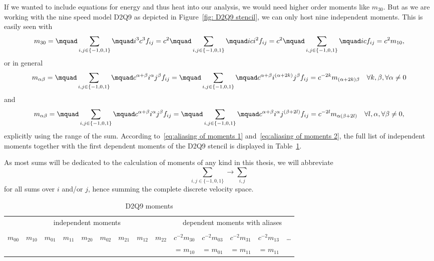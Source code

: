 If we wanted to include equations for energy and thus heat into our analysis, we would need higher order moments like $m_{30}$.
But as we are working with the nine speed model D2Q9 as depicted in Figure~\ref{fig: D2Q9 stencil}, we can only host nine independent moments.
This is easily seen with
\begin{equation*}
  m_{30} = \mquad\sum_{i,j \in \{-1,0,1\}}\mquad i^3 c^3 f_{ij} = c^2\mquad\sum_{i,j \in \{-1,0,1\}}\mquad ic i^2 f_{ij} = c^2 \mquad\sum_{i,j \in \{-1,0,1\}}\mquad ic f_{ij} = c^2 m_{10},
\end{equation*}
or in general
\begin{equation}
  \label{eq:aliasing of moments 1}
  m_{\alpha\beta}
  = \mquad\sum_{i,j \in \{-1,0,1\}}\mquad c^{\alpha+\beta} i^\alpha j^\beta f_{ij}
  = \mquad\sum_{i,j \in \{-1,0,1\}}\mquad c^{\alpha+\beta}i^{(\alpha+2k)} j^\beta f_{ij}
  = c^{-2k} m_{(\alpha+2k)\beta} \quad \forall k,\beta, \forall \alpha \neq 0
\end{equation}
and
\begin{equation}
  \label{eq:aliasing of moments 2}
  m_{\alpha\beta}
  = \mquad\sum_{i,j \in \{-1,0,1\}}\mquad c^{\alpha+\beta} i^\alpha j^\beta f_{ij}
  = \mquad\sum_{i,j \in \{-1,0,1\}}\mquad c^{\alpha+\beta} i^\alpha j^{(\beta+2l)} f_{ij}
  = c^{-2l}m_{\alpha(\beta+2l)} \quad \forall l, \alpha, \forall \beta \neq 0,
\end{equation}
explicitly using the range of the sum.
According to~\eqref{eq:aliasing of moments 1} and~\eqref{eq:aliasing of moments 2}, the full list of independent moments together with the first dependent moments of the D2Q9 stencil is displayed in Table~\ref{table:D2Q9 moments}.

As most sums will be dedicated to the calculation of moments of any kind in this thesis, we will abbreviate
\begin{equation*}
  \sum_{i,j \in \{-1,0,1\}} \rightarrow \sum_{i,j}
\end{equation*}
for all sums over $i$ and/or $j$, hence summing the complete discrete velocity space.

\setlength{\tabcolsep}{4.4pt}
\begin{table} [t]
  \centering
  \begin{tabular}{r rr rrr rr r rrrr r}
    \toprule
    \multicolumn{9}{c}{independent moments} & \multicolumn{5}{c}{dependent moments with aliases}   \\
    \cmidrule(lr){1-9}\cmidrule(lr){10-14} \\
    $m_{00}$
    & $m_{10}$
    & $m_{01}$
    & $m_{11}$
    & $m_{20}$
    & $m_{02}$
    & $m_{21}$
    & $m_{12}$
    & $m_{22}$
    & $c^{-2}m_{30}$
    & $c^{-2}m_{03}$
    & $c^{-2}m_{31}$
    & $c^{-2}m_{13}$
    & \ldots \\
    &&&&&&&&
    & = $m_{10}$
    & = $m_{01}$
    & = $m_{11}$
    & = $m_{11}$ & \\
    \bottomrule
  \end{tabular}
  \caption{D2Q9 moments}\label{table:D2Q9 moments}
\end{table}
